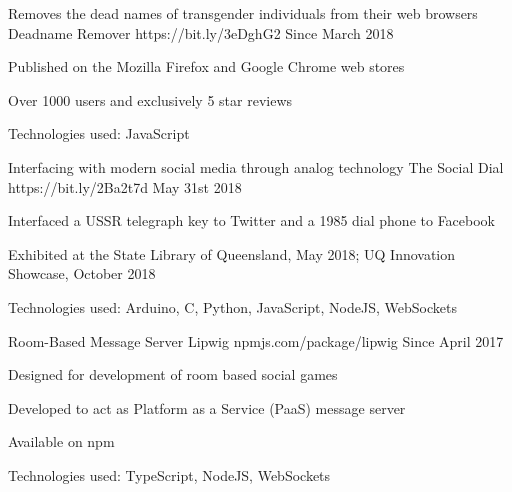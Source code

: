 


\begin{cventries}

\cventry
{Removes the dead names of transgender individuals from their web browsers} %
{Deadname Remover} %
{https://bit.ly/3eDghG2} %
{Since March 2018} %
{ %
\begin{cvitems}
\item Published on the Mozilla Firefox and Google Chrome web stores
\item Over 1000 users and exclusively 5 star reviews
\item Technologies used: JavaScript
\end{cvitems}
}

\cventry
{Interfacing with modern social media through analog technology} %
{The Social Dial} %
{https://bit.ly/2Ba2t7d} %
{May 31st 2018} %
{ %
\begin{cvitems}
\item Interfaced a USSR telegraph key to Twitter and a 1985 dial phone to Facebook
\item Exhibited at the State Library of Queensland, May 2018; UQ Innovation Showcase, October 2018
\item Technologies used: Arduino, C, Python, JavaScript, NodeJS, WebSockets
\end{cvitems}
}

\cventry
{Room-Based Message Server} %
{Lipwig} %
{npmjs.com/package/lipwig} %
{Since April 2017} %
{ %
\begin{cvitems}
\item Designed for development of room based social games
\item Developed to act as Platform as a Service (PaaS) message server
\item Available on npm
\item Technologies used: TypeScript, NodeJS, WebSockets
\end{cvitems}
}


\end{cventries}
